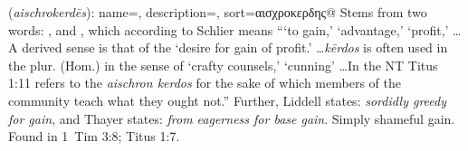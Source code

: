 \item[Shameful gain,]

(\textit{aischrokerdēs}):
{
    name=,
    description={},
    sort=αισχροκερδης@
}
Stems from two words:  , and , which according to Schlier means ```to gain,' `advantage,' `profit,' \ldots A derived sense is that of the `desire for gain of profit.' \ldots \emph{kērdos} is often used in the plur. (Hom.) in the sense of `crafty counsels,' `cunning' \ldots In the NT Titus 1:11 refers to the \emph{aischron kerdos} for the sake of which members of the community teach what they ought not.'' 
Further, Liddell states: \emph{sordidly greedy for gain}, and Thayer states: \emph{from eagerness for base gain}. Simply shameful gain.
Found in 1~Tim 3:8; Titus 1:7.
